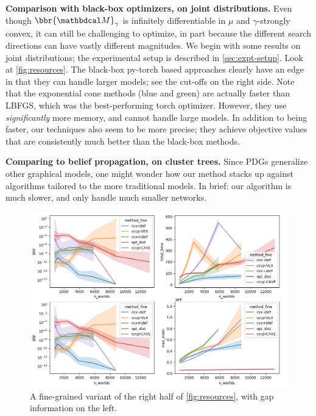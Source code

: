 \textbf{Comparison with black-box optimizers, on joint distributions. }
Even though $\bbr{\dg M}_\gamma$ is infinitely differentiable in $\mu$ and $\gamma$-strongly convex, it can still be challenging to optimize, in part because the different search directions can have vastly different magnitudes.
We begin with some results on joint distributions; 
the experimental setup is described in \cref{sec:expt-setup}.
%
Look at \cref{fig:resources}.
The black-box py-torch based approaches clearly have an edge in that they can handle larger models; see the cut-offs on the right side.
Note that the exponential cone methods (blue and green) are actually faster than LBFGS, which was the best-performing torch optimizer.
However, they use \emph{significantly} more memory, and cannot handle large models.
In addition to being faster, our techniques also seem to be more precise; they achieve objective values that are consistently much better than the black-box methods.





\textbf{Comparing to belief propagation, on cluster trees.}
Since PDGs generalize other graphical models, one might wonder how our method stacks up against algorithms tailored to the more traditional models. In brief: our algorithm is much slower, and only handle much smaller networks. 

\begin{figure}
    \includegraphics[width=\linewidth]{figs/1}
    \caption{
        A fine-grained variant of the right half of \cref{fig:resources},
        with gap information on the left.
    }\label{fig:gap-resource-fine}
\end{figure}




